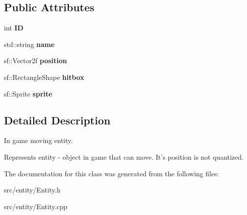 \subsection*{Public Attributes}
\begin{DoxyCompactItemize}
\item 
\hypertarget{classEntity_a5c92b546dedae9ce473274d82c8585f6}{int {\bfseries I\-D}}\label{classEntity_a5c92b546dedae9ce473274d82c8585f6}

\item 
\hypertarget{classEntity_a931b21fbdebb1a5963b4bcab5df128f5}{std\-::string {\bfseries name}}\label{classEntity_a931b21fbdebb1a5963b4bcab5df128f5}

\item 
\hypertarget{classEntity_afc349ec89c2bffef70bf6a1d95603154}{sf\-::\-Vector2f {\bfseries position}}\label{classEntity_afc349ec89c2bffef70bf6a1d95603154}

\item 
\hypertarget{classEntity_a40a4575edd686de037d61aad026f2790}{sf\-::\-Rectangle\-Shape {\bfseries hitbox}}\label{classEntity_a40a4575edd686de037d61aad026f2790}

\item 
\hypertarget{classEntity_a48ef4ab143b8d0211877c9f6be42e824}{sf\-::\-Sprite {\bfseries sprite}}\label{classEntity_a48ef4ab143b8d0211877c9f6be42e824}

\end{DoxyCompactItemize}


\subsection{Detailed Description}
In game moving entity. 

Represents entity -\/ object in game that can move. It's position is not quantized. 

The documentation for this class was generated from the following files\-:\begin{DoxyCompactItemize}
\item 
src/entity/Entity.\-h\item 
src/entity/Entity.\-cpp\end{DoxyCompactItemize}
